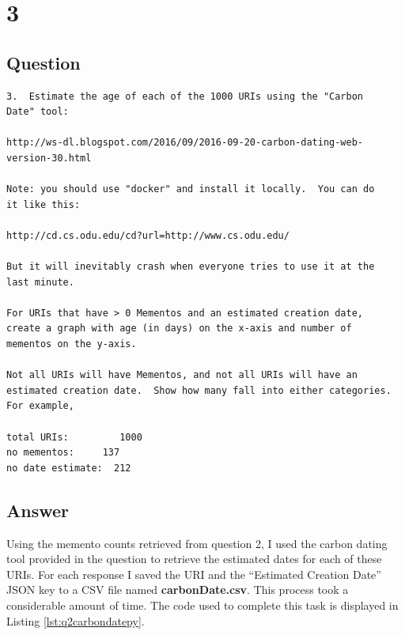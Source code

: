 \documentclass[letterpaper,11pt]{article}
\newcommand*{\srcPath}{../src}%
\begin{document}
\clearpage


\section*{3}

\subsection*{Question}

\begin{verbatim}
3.  Estimate the age of each of the 1000 URIs using the "Carbon
Date" tool:

http://ws-dl.blogspot.com/2016/09/2016-09-20-carbon-dating-web-version-30.html

Note: you should use "docker" and install it locally.  You can do
it like this:

http://cd.cs.odu.edu/cd?url=http://www.cs.odu.edu/

But it will inevitably crash when everyone tries to use it at the
last minute.

For URIs that have > 0 Mementos and an estimated creation date,
create a graph with age (in days) on the x-axis and number of
mementos on the y-axis.

Not all URIs will have Mementos, and not all URIs will have an
estimated creation date.  Show how many fall into either categories.
For example,

total URIs:         1000
no mementos:     137  
no date estimate:  212
\end{verbatim}

\clearpage
\subsection*{Answer}

Using the memento counts retrieved from question 2, I used the carbon dating tool provided in the question to retrieve the estimated dates for each of these URIs. For each response I saved the URI and the ``Estimated Creation Date'' JSON key to a CSV file named \textbf{carbonDate.csv}. This process took a considerable amount of time. The code used to complete this task is displayed in Listing \ref{lst:q2carbondatepy}. 


\end{document}
